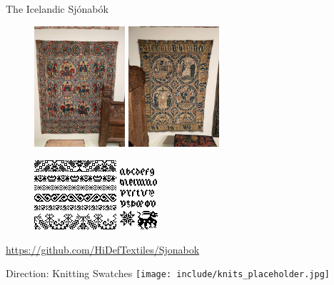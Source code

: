 \documentclass[
    NAME={Dr. Helga Ingimundardóttir},
    EMAIL={helgaingim@hi.is},
    FACULTY={Industrial Engineering},
    TITLE={HiDef Textiles: Reviving Tradition with Innovation},
    SUBTITLE={Empowering Creativity and Sustainability in Textile Production through Digital Transformation},
    SEMINAR={Reykjavík DataBeers},
    DATE={January 25, 2025},
    WIDE={true}
]{HI-LaTeX/hi-beamer}
\begin{document}
\begin{frame}[allowframebreaks]{The Icelandic Sjónabók}
\begin{figure}
            \framebreak
            \includegraphics[width=0.3\textwidth]{include/riddarateppi.jpg}
            \includegraphics[width=0.3\textwidth]{include/ævijesú.jpg}
        \end{figure}

        \framebreak

        \begin{figure}

            \includegraphics[height=.65\textheight]{include/thjms2008-14_560.png}\hspace{24pt}
            \includegraphics[height=.65\textheight]{include/thjms2008-14_562.png}
        \end{figure}
        \url{https://github.com/HiDefTextiles/Sjonabok}
    \end{frame}


\begin{frame}{Direction: Knitting Swatches}
\centering
\texttt{[image: include/knits\_placeholder.jpg]}
\end{frame}
\end{document}

